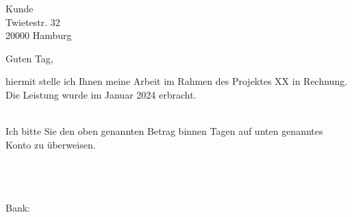 \documentclass[DIN,version=last]{scrlttr2}
\begin{document}
\begin{letter}{Kunde\\Twietestr. 32\\20000 Hamburg}

\opening{Guten Tag,}

hiermit stelle ich Ihnen meine Arbeit im Rahmen des Projektes XX in Rechnung. Die Leistung wurde im Januar 2024 erbracht.


\vspace{\baselineskip}
\PrintInvoiceTabular
{}\\

Ich bitte Sie den oben genannten Betrag binnen \paymentdays{} Tagen auf unten genanntes Konto zu überweisen.

 \tab{}\\
 \tab{}\\
 \tab{}\\
Bank: \tab{}\\

 \\

\end{letter}
\end{document}
